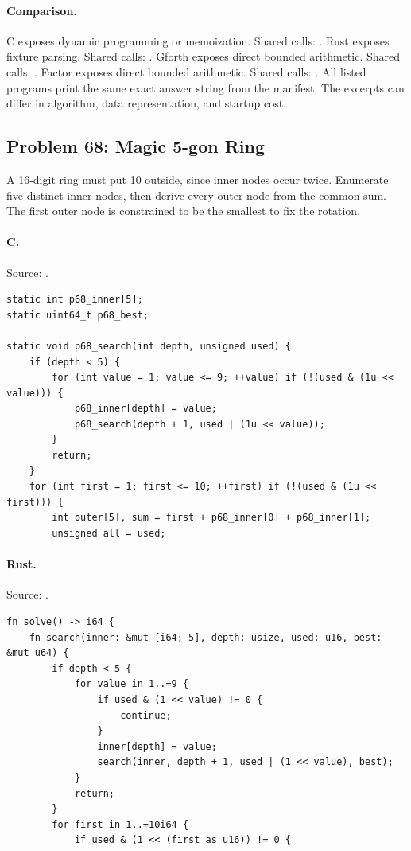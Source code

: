 \paragraph{Comparison.}
C exposes dynamic programming or memoization. Shared calls: \texttt{}. Rust exposes fixture parsing. Shared calls: \texttt{}. Gforth exposes direct bounded arithmetic. Shared calls: \texttt{}. Factor exposes direct bounded arithmetic. Shared calls: \texttt{}.
All listed programs print the same exact answer string from the manifest. The excerpts can differ in algorithm, data representation, and startup cost.

\subsection{Problem 68: Magic 5-gon Ring}
\label{walkthrough:p68}
A 16-digit ring must put 10 outside, since inner nodes occur twice. Enumerate five distinct inner nodes, then derive every outer node from the common sum. The first outer node is constrained to be the smallest to fix the rotation.

\paragraph{C.} Source: .
\begin{lstlisting}
static int p68_inner[5];
static uint64_t p68_best;

static void p68_search(int depth, unsigned used) {
    if (depth < 5) {
        for (int value = 1; value <= 9; ++value) if (!(used & (1u << value))) {
            p68_inner[depth] = value;
            p68_search(depth + 1, used | (1u << value));
        }
        return;
    }
    for (int first = 1; first <= 10; ++first) if (!(used & (1u << first))) {
        int outer[5], sum = first + p68_inner[0] + p68_inner[1];
        unsigned all = used;
\end{lstlisting}

\paragraph{Rust.} Source: .
\begin{lstlisting}
fn solve() -> i64 {
    fn search(inner: &mut [i64; 5], depth: usize, used: u16, best: &mut u64) {
        if depth < 5 {
            for value in 1..=9 {
                if used & (1 << value) != 0 {
                    continue;
                }
                inner[depth] = value;
                search(inner, depth + 1, used | (1 << value), best);
            }
            return;
        }
        for first in 1..=10i64 {
            if used & (1 << (first as u16)) != 0 {
\end{lstlisting}

